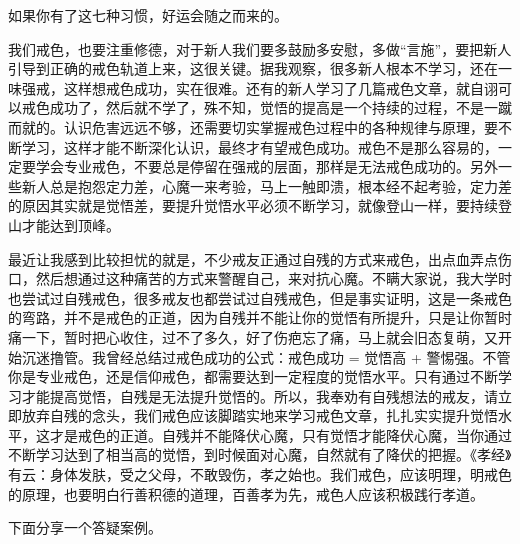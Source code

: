 如果你有了这七种习惯，好运会随之而来的。

我们戒色，也要注重修德，对于新人我们要多鼓励多安慰，多做“言施”，要把新人引导到正确的戒色轨道上来，这很关键。据我观察，很多新人根本不学习，还在一味强戒，这样想戒色成功，实在很难。还有的新人学习了几篇戒色文章，就自诩可以戒色成功了，然后就不学了，殊不知，觉悟的提高是一个持续的过程，不是一蹴而就的。认识危害远远不够，还需要切实掌握戒色过程中的各种规律与原理，要不断学习，这样才能不断深化认识，最终才有望戒色成功。戒色不是那么容易的，一定要学会专业戒色，不要总是停留在强戒的层面，那样是无法戒色成功的。另外一些新人总是抱怨定力差，心魔一来考验，马上一触即溃，根本经不起考验，定力差的原因其实就是觉悟差，要提升觉悟水平必须不断学习，就像登山一样，要持续登山才能达到顶峰。

最近让我感到比较担忧的就是，不少戒友正通过自残的方式来戒色，出点血弄点伤口，然后想通过这种痛苦的方式来警醒自己，来对抗心魔。不瞒大家说，我大学时也尝试过自残戒色，很多戒友也都尝试过自残戒色，但是事实证明，这是一条戒色的弯路，并不是戒色的正道，因为自残并不能让你的觉悟有所提升，只是让你暂时痛一下，暂时把心收住，过不了多久，好了伤疤忘了痛，马上就会旧态复萌，又开始沉迷撸管。我曾经总结过戒色成功的公式：戒色成功 = 觉悟高 + 警惕强。不管你是专业戒色，还是信仰戒色，都需要达到一定程度的觉悟水平。只有通过不断学习才能提高觉悟，自残是无法提升觉悟的。所以，我奉劝有自残想法的戒友，请立即放弃自残的念头，我们戒色应该脚踏实地来学习戒色文章，扎扎实实提升觉悟水平，这才是戒色的正道。自残并不能降伏心魔，只有觉悟才能降伏心魔，当你通过不断学习达到了相当高的觉悟，到时候面对心魔，自然就有了降伏的把握。《孝经》有云：身体发肤，受之父母，不敢毁伤，孝之始也。我们戒色，应该明理，明戒色的原理，也要明白行善积德的道理，百善孝为先，戒色人应该积极践行孝道。

下面分享一个答疑案例。

